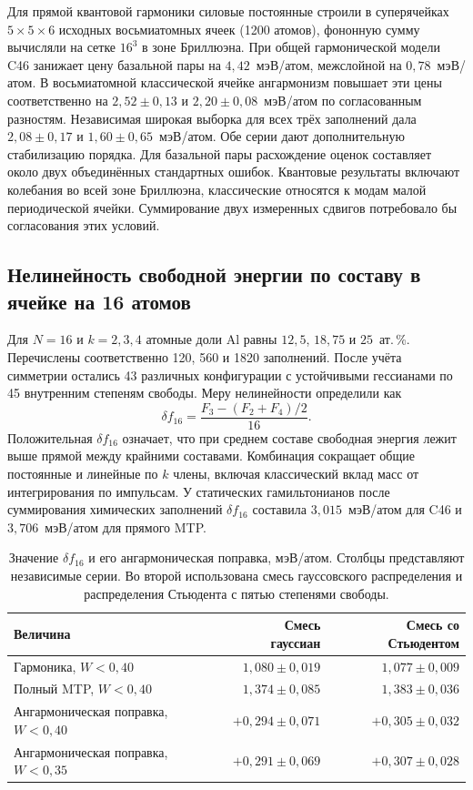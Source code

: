 \documentclass[11pt,a4paper]{article}
\begin{document}
Для прямой квантовой гармоники силовые постоянные строили в суперячейках
$5\times5\times6$ исходных восьмиатомных ячеек (1200 атомов), фононную
сумму вычисляли на сетке $16^3$ в зоне Бриллюэна. При общей гармонической
модели C46 занижает цену базальной пары на $4{,}42$~мэВ/атом, межслойной
на $0{,}78$~мэВ/атом. В восьмиатомной классической ячейке ангармонизм
повышает эти цены соответственно на $2{,}52\pm0{,}13$ и
$2{,}20\pm0{,}08$~мэВ/атом по согласованным разностям. Независимая широкая
выборка для всех трёх заполнений дала $2{,}08\pm0{,}17$ и
$1{,}60\pm0{,}65$~мэВ/атом. Обе серии дают дополнительную стабилизацию порядка.
Для базальной пары расхождение оценок составляет около двух объединённых
стандартных ошибок. Квантовые результаты включают колебания во всей зоне
Бриллюэна, классические относятся к модам малой периодической ячейки.
Суммирование двух измеренных сдвигов потребовало бы согласования этих условий.

\subsection{Нелинейность свободной энергии по составу в ячейке на 16 атомов}

Для $N=16$ и $k=2,3,4$ атомные доли Al равны $12{,}5$, $18{,}75$ и
$25$~ат.\,\%. Перечислены соответственно 120, 560 и 1820 заполнений. После
учёта симметрии остались 43 различных конфигурации с устойчивыми гессианами
по 45 внутренним степеням свободы. Меру нелинейности определили как
\[
 \delta f_{16}=\frac{F_3-(F_2+F_4)/2}{16}.
\]
Положительная $\delta f_{16}$ означает, что при среднем составе свободная
энергия лежит выше прямой между крайними составами. Комбинация сокращает
общие постоянные и линейные по $k$ члены, включая классический вклад масс
от интегрирования по импульсам. У статических гамильтонианов после
суммирования химических заполнений $\delta f_{16}$ составила
$3{,}015$~мэВ/атом для C46 и $3{,}706$~мэВ/атом для прямого MTP.

\begin{table}[htbp]
\centering\small
\caption{Значение $\delta f_{16}$ и его ангармоническая поправка, мэВ/атом.
Столбцы представляют независимые серии. Во второй использована смесь
гауссовского распределения и распределения Стьюдента с пятью степенями свободы.}
\label{tab:small16}
\begin{tabular}{@{}lrr@{}}
\toprule
Величина & Смесь гауссиан & Смесь со Стьюдентом\\
\midrule
Гармоника, $W<0{,}40$ & $1{,}080\pm0{,}019$ & $1{,}077\pm0{,}009$\\
Полный MTP, $W<0{,}40$ & $1{,}374\pm0{,}085$ & $1{,}383\pm0{,}036$\\
Ангармоническая поправка, $W<0{,}40$ & $+0{,}294\pm0{,}071$ & $+0{,}305\pm0{,}032$\\
Ангармоническая поправка, $W<0{,}35$ & $+0{,}291\pm0{,}069$ & $+0{,}307\pm0{,}028$\\
\bottomrule
\end{tabular}
\end{table}
\end{document}
